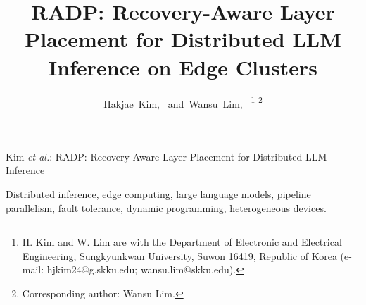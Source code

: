 \documentclass[journal]{IEEEtran}
\newcommand{\sys}{RADP\xspace}
\begin{document}
\title{\sys{}: Recovery-Aware Layer Placement for Distributed LLM Inference on Edge Clusters}

\author{Hakjae~Kim,~
  and~Wansu~Lim,~
  \thanks{H. Kim and W. Lim are with the Department of Electronic and
  Electrical Engineering, Sungkyunkwan University, Suwon 16419, Republic of
  Korea (e-mail: hjkim24@g.skku.edu; wansu.lim@skku.edu).}%
  \thanks{Corresponding author: Wansu Lim.}}

%
{Kim \MakeLowercase{\textit{et al.}}: \sys{}: Recovery-Aware Layer Placement for Distributed LLM Inference}

\maketitle



\begin{IEEEkeywords}
Distributed inference, edge computing, large language models, pipeline
parallelism, fault tolerance, dynamic programming, heterogeneous devices.
\end{IEEEkeywords}

\IEEEpeerreviewmaketitle








\nocite{*}


\end{document}
